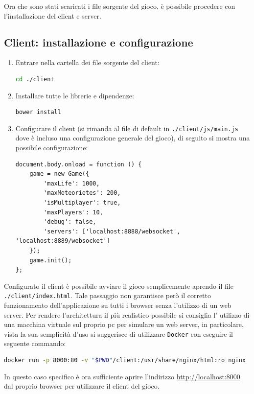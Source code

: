 \documentclass[paper=a4, fontsize=11pt]{scrartcl} %
\numberwithin{equation}{section} %
\numberwithin{figure}{section} %
\numberwithin{table}{section} %
\begin{document}
Ora che sono stati scaricati i file sorgente del gioco, è possibile procedere con l'installazione del client e server.

\subsection{Client: installazione e configurazione}
\begin{enumerate}  
\item
Entrare nella cartella dei file sorgente del client:
\begin{lstlisting}[language=bash]
cd ./client
\end{lstlisting}

\item
Installare tutte le librerie e dipendenze:
\begin{lstlisting}[language=bash]
bower install
\end{lstlisting}

\item
Configurare il client (si rimanda al file di default in \texttt{./client/js/main.js} dove è incluso una configurazione generale del gioco), di seguito si mostra una possibile configurazione:
\begin{lstlisting}
document.body.onload = function () {
    game = new Game({
        'maxLife': 1000,
        'maxMeteorietes': 200,
        'isMultiplayer': true,
        'maxPlayers': 10,
        'debug': false,
        'servers': ['localhost:8888/websocket', 'localhost:8889/websocket']
    });
    game.init();
};
\end{lstlisting}
\end{enumerate}

Configurato il client è possibile avviare il gioco semplicemente aprendo il file \texttt{./client/index.html}.
Tale passaggio non garantisce però il corretto funzionamento dell'applicazione su tutti i browser senza l'utilizzo di un web server.
Per rendere l'architettura il più realistico possibile si consiglia l' utilizzo di una macchina virtuale sul proprio pc per simulare un web server, in particolare, vista la sua semplicità d'uso
si suggerisce di utilizzare \texttt{Docker}\cite{docker} con eseguire il seguente commando:
\begin{lstlisting}[language=bash]
docker run -p 8000:80 -v "$PWD"/client:/usr/share/nginx/html:ro nginx
\end{lstlisting}
In questo caso specifico è ora sufficiente aprire l'indirizzo \url{http://localhost:8000} dal proprio browser per utilizzare il client del gioco.
\end{document}
